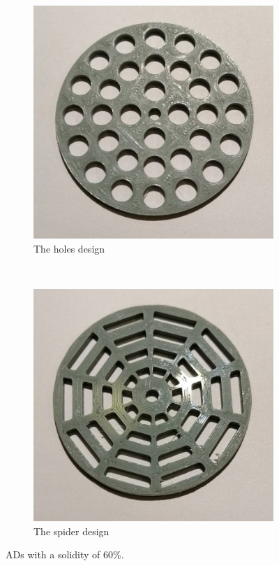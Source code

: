 \begin{figure} [h!]
    \centering
    \begin{subfigure}[b]{0.45\linewidth}
        \includegraphics[width=\textwidth]{0_Images/holes60.jpg}
        \caption{The \gls{holes} design}
        \label{Fig:holes60}
    \end{subfigure}
    ~
    \begin{subfigure}[b]{0.45\linewidth}
        \includegraphics[width=\textwidth]{0_Images/spider60.jpg}
        \caption{The \gls{spider} design}
        \label{Fig:spider60}
    \end{subfigure}
    \caption{\gls{AD}s with a solidity of 60\%.}
    \label{Fig:60Sol}
\end{figure}

